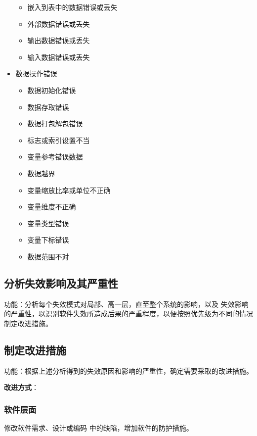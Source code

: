 \begin{multicols}{2}
\begin{itemize}
\begin{itemize}
        \item 嵌入到表中的数据错误或丢失
        \item 外部数据错误或丢失
        \item 输出数据错误或丢失
        \item 输入数据错误或丢失
    \end{itemize}
    \item 数据操作错误
    \begin{itemize}
        \item 数据初始化错误
        \item 数据存取错误
        \item 数据打包解包错误
        \item 标志或索引设置不当
        \item 变量参考错误数据
        \item 数据越界
        \item 变量缩放比率或单位不正确
        \item 变量维度不正确
        \item 变量类型错误
        \item 变量下标错误
        \item 数据范围不对
    \end{itemize}
\end{itemize}
\end{multicols}

\subsection{分析失效影响及其严重性}

功能：分析每个失效模式对局部、高一层，直至整个系统的影响，以及
失效影响的严重性，以识别软件失效所造成后果的严重程度，以便按照优先级为不同的情况制定改进措施。

\subsection{制定改进措施}

功能：根据上述分析得到的失效原因和影响的严重性，确定需要采取的改进措施。

\textbf{改进方式}：

\subsubsection{软件层面}

修改软件需求、设计或编码
中的缺陷，增加软件的防护措施。

